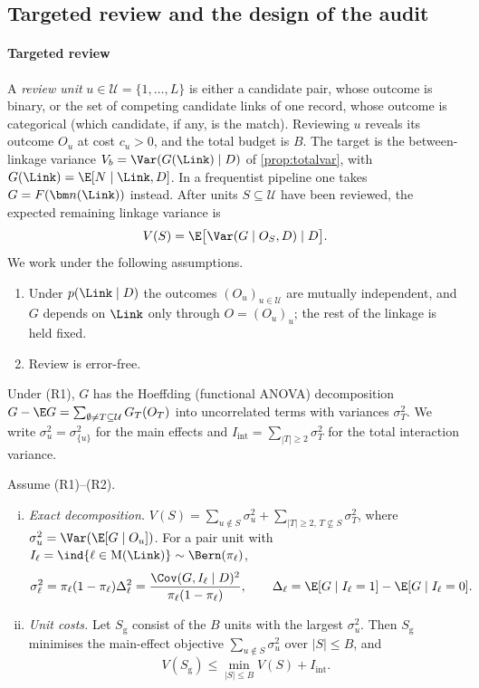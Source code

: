 \subsection{Targeted review and the design of the audit}\label{app:link-reviewdetails}

\paragraph{Targeted review}
A \emph{review unit} $u\in\mathcal U=\{1,\dots,L\}$ is either a candidate pair, whose outcome is binary, or the set of competing candidate links of one record, whose outcome is categorical (which candidate, if any, is the match). Reviewing $u$ reveals its outcome $O_u$ at cost $c_u>0$, and the total budget is $B$. The target is the between-linkage variance $V_b=\Var(G(\Link)\mid D)$ of \cref{prop:totalvar}, with $G(\Link)=\E[N\mid\Link,D]$. In a frequentist pipeline one takes $G=F(\bm n(\Link))$ instead. After units $S\subseteq\mathcal U$ have been reviewed, the expected remaining linkage variance is
\[
  V(S)=\E\bigl[\Var(G\mid O_S,D)\mid D\bigr].
\]
We work under the following assumptions.
\begin{enumerate}[({R}1)]
  \item Under $p(\Link\mid D)$ the outcomes $(O_u)_{u\in\mathcal U}$ are mutually independent, and $G$ depends on $\Link$ only through $O=(O_u)_u$; the rest of the linkage is held fixed.
  \item Review is error-free.
\end{enumerate}
Under (R1), $G$ has the Hoeffding (functional ANOVA) decomposition $G-\E G=\sum_{\emptyset\ne T\subseteq\mathcal U}G_T(O_T)$ into uncorrelated terms with variances $\sigma_T^2$. We write $\sigma_u^2=\sigma_{\{u\}}^2$ for the main effects and $I_{\mathrm{int}}=\sum_{|T|\ge2}\sigma_T^2$ for the total interaction variance.


\begin{theorem}\label{thm:review}
Assume (R1)--(R2).
\begin{enumerate}[(i)]
  \item \emph{Exact decomposition.} $V(S)=\sum_{u\notin S}\sigma_u^2+\sum_{|T|\ge2,\,T\not\subseteq S}\sigma_T^2$, where $\sigma_u^2=\Var(\E[G\mid O_u])$. For a pair unit with $I_\ell=\ind{\ell\in\mathrm M(\Link)}\sim\Bern(\pi_\ell)$,
  \begin{equation}\label{eq:link-sigma}
    \sigma_\ell^2=\pi_\ell(1-\pi_\ell)\Delta_\ell^2=\frac{\Cov(G,I_\ell\mid D)^2}{\pi_\ell(1-\pi_\ell)},\qquad \Delta_\ell=\E[G\mid I_\ell=1]-\E[G\mid I_\ell=0].
  \end{equation}
  \item \emph{Unit costs.} Let $S_{\mathrm g}$ consist of the $B$ units with the largest $\sigma_u^2$. Then $S_{\mathrm g}$ minimises the main-effect objective $\sum_{u\notin S}\sigma_u^2$ over $|S|\le B$, and
  \[
    V(S_{\mathrm g})\le\min_{|S|\le B}V(S)+I_{\mathrm{int}} .
  \]
\end{enumerate}
\end{theorem}

